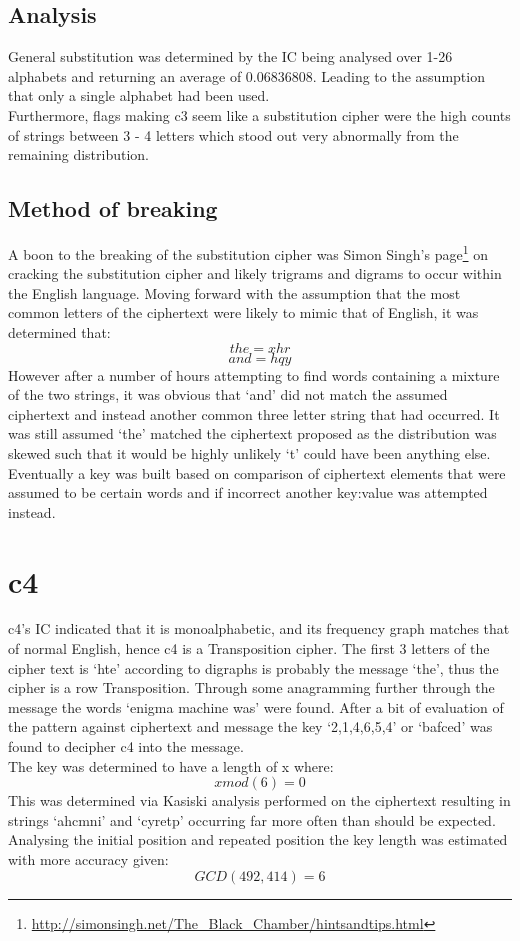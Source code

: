 \documentclass{article}
\begin{document}
      \subsection{Analysis}
      General substitution was determined by the IC being analysed over 1-26 alphabets 
      and returning an average of 0.06836808. Leading to the assumption that only a single
      alphabet had been used.\\
      Furthermore, flags making c3 seem like a substitution cipher were the high counts of strings
      between 3 - 4 letters which stood out very abnormally from the remaining distribution.\\
      \subsection{Method of breaking} 
      A boon to the breaking of the substitution cipher was Simon Singh's page\cite{BlackChamber}\footnote{\url{http://simonsingh.net/The_Black_Chamber/hintsandtips.html}}
      on cracking the substitution cipher and likely trigrams and digrams to occur within the English language.
      Moving forward with the assumption that the most common letters of the ciphertext were likely
      to mimic that of English, it was determined that: \[the = xhr\] \[and = hqy\]
      However after a number of hours attempting to find words containing a mixture of the two
      strings, it was obvious that `and' did not match the assumed ciphertext and instead another
      common three letter string that had occurred. It was still assumed `the' matched the ciphertext proposed
      as the distribution was skewed such that it would be highly unlikely `t' could have been 
      anything else.\\
      Eventually a key was built based on comparison of ciphertext elements that were assumed to be certain words
      and if incorrect another key:value was attempted instead.

      \section{c4}
      c4's IC indicated that it is monoalphabetic, and its frequency graph matches that
      of normal English, hence c4 is a Transposition cipher. The first 3 letters of the
      cipher text is `hte' according to digraphs is probably the message `the', thus the
      cipher is a row Transposition. Through some anagramming further through the message 
      the words `enigma machine was' were found. After a bit of evaluation of the pattern 
      against ciphertext and message the key `2,1,4,6,5,4' or `bafced' was found to decipher 
      c4 into the message. \\
      The key was determined to have a length of x where: \[x mod (6) = 0\]
      This was determined via Kasiski analysis performed on the ciphertext resulting in strings 
      `ahcmni' and `cyretp' occurring far more often than should be expected.
      Analysing the initial position and repeated position the key length was estimated
      with more accuracy given: \[ GCD(492,414) = 6 \]
  
\end{document}
